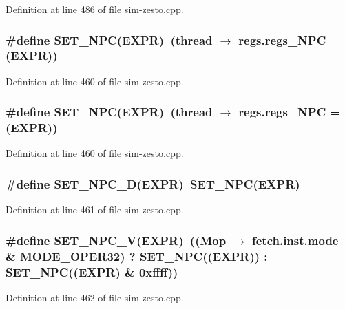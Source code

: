 Definition at line 486 of file sim-zesto.cpp.
\subsubsection[{SET\_\-NPC}]{\setlength{\rightskip}{0pt plus 5cm}\#define SET\_\-NPC(EXPR)~(thread $\rightarrow$ regs.regs\_\-NPC = (EXPR))}\label{sim-zesto_8cpp_865b63e02a03e6220f36dfedfaf171f0}




Definition at line 460 of file sim-zesto.cpp.
\subsubsection[{SET\_\-NPC}]{\setlength{\rightskip}{0pt plus 5cm}\#define SET\_\-NPC(EXPR)~(thread $\rightarrow$ regs.regs\_\-NPC = (EXPR))}\label{sim-zesto_8cpp_865b63e02a03e6220f36dfedfaf171f0}




Definition at line 460 of file sim-zesto.cpp.
\subsubsection[{SET\_\-NPC\_\-D}]{\setlength{\rightskip}{0pt plus 5cm}\#define SET\_\-NPC\_\-D(EXPR)~SET\_\-NPC(EXPR)}\label{sim-zesto_8cpp_237e92c04084e04a6903083038b0d2b3}




Definition at line 461 of file sim-zesto.cpp.
\subsubsection[{SET\_\-NPC\_\-V}]{\setlength{\rightskip}{0pt plus 5cm}\#define SET\_\-NPC\_\-V(EXPR)~((Mop $\rightarrow$ fetch.inst.mode \& MODE\_\-OPER32) ? SET\_\-NPC((EXPR)) : SET\_\-NPC((EXPR) \& 0xffff))}\label{sim-zesto_8cpp_5df75989ea017f05abfeeaaca9c34c4b}




Definition at line 462 of file sim-zesto.cpp.
